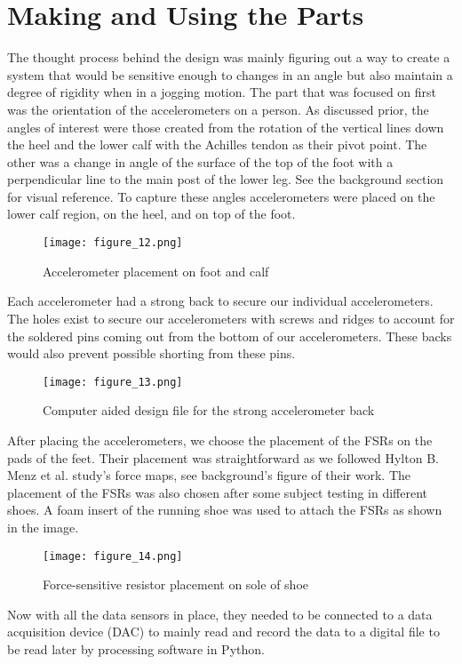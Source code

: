 \section{Making and Using the Parts}
The thought process behind the design was mainly figuring out a way to create a system that would be sensitive enough to changes in an angle but also maintain a degree of rigidity when in a jogging motion.
The part that was focused on first was the orientation of the accelerometers on a person.
As discussed prior, the angles of interest were those created from the rotation of the vertical lines down the heel and the lower calf with the Achilles tendon as their pivot point.
The other was a change in angle of the surface of the top of the foot with a perpendicular line to the main post of the lower leg.
See the background section for visual reference.
To capture these angles accelerometers were placed on the lower calf region, on the heel, and on top of the foot.\par
\begin{figure}
  \centering
  \texttt{[image: figure\_12.png]}
  \caption[Accelerometer placement]{Accelerometer placement on foot and calf}
  \label{fig:x foot and calf}
\end{figure}
Each accelerometer had a strong back to secure our individual accelerometers.
The holes exist to secure our accelerometers with screws and ridges to account for the soldered pins coming out from the bottom of our accelerometers.
These backs would also prevent possible shorting from these pins.\par
\begin{figure}
  \centering
  \texttt{[image: figure\_13.png]}
  \caption[CAD file]{Computer aided design file for the strong accelerometer back}
  \label{fig:x cad file}
\end{figure}
After placing the accelerometers, we choose the placement of the FSRs on the pads of the feet.
Their placement was straightforward as we followed Hylton B. Menz et al. study’s force maps, see background’s figure of their work.
The placement of the FSRs was also chosen after some subject testing in different shoes.
A foam insert of the running shoe was used to attach the FSRs as shown in the image.\par
\begin{figure}
  \centering
  \texttt{[image: figure\_14.png]}
  \caption[FSR placement in shoe]{Force-sensitive resistor placement on sole of shoe}
  \label{fig:x fsr placement}
\end{figure}
Now with all the data sensors in place, they needed to be connected to a data acquisition device (DAC) to mainly read and record the data to a digital file to be read later by processing software in Python.\par
